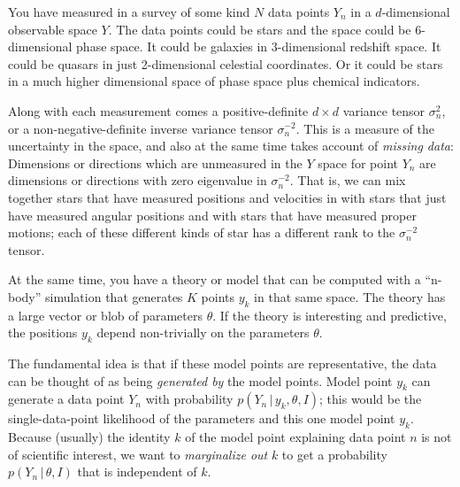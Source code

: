 \documentclass[12pt,pdftex,preprint]{aastex}
\newcommand{\given}{\,|\,}
\begin{document}
You have measured in a survey of some kind $N$ data points $Y_n$ in a
$d$-dimensional observable space $Y$.  The data points could be stars
and the space could be 6-dimensional phase space.  It could be
galaxies in 3-dimensional redshift space.  It could be quasars in just
2-dimensional celestial coordinates.  Or it could be stars in a much
higher dimensional space of phase space plus chemical indicators.

Along with each measurement comes a positive-definite $d\times d$
variance tensor $\sigma^2_n$, or a non-negative-definite inverse
variance tensor $\sigma^{-2}_n$.  This is a measure of the uncertainty
in the space, and also at the same time takes account of \emph{missing
  data}: Dimensions or directions which are unmeasured in the $Y$
space for point $Y_n$ are dimensions or directions with zero
eigenvalue in $\sigma^{-2}_n$.  That is, we can mix together stars
that have measured positions and velocities in with stars that just
have measured angular positions and with stars that have measured
proper motions; each of these different kinds of star has a different
rank to the $\sigma^{-2}_n$ tensor.

At the same time, you have a theory or model that can be computed with
a ``n-body'' simulation that generates $K$ points $y_k$ in that same
space.  The theory has a large vector or blob of parameters $\theta$.
If the theory is interesting and predictive, the positions $y_k$
depend non-trivially on the parameters $\theta$.

The fundamental idea is that if these model points are representative,
the data can be thought of as being \emph{generated by} the model
points.  Model point $y_k$ can generate a data point $Y_n$ with
probability $p(Y_n\given y_k,\theta,I)$; this would be the
single-data-point likelihood of the parameters and this one model
point $y_k$.  Because (usually) the identity $k$ of the model point
explaining data point $n$ is not of scientific interest, we want to
\emph{marginalize out} $k$ to get a probability $p(Y_n\given\theta,I)$
that is independent of $k$.
\end{document}
